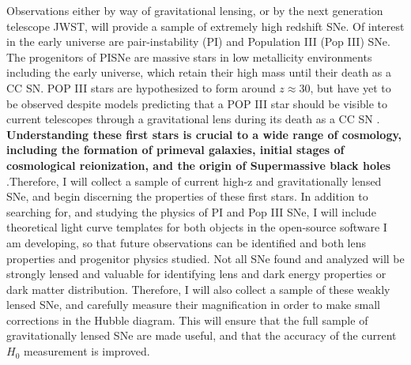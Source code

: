 Observations either  by way of  gravitational lensing, or by  the next
generation telescope  JWST, will  provide a  sample of  extremely high
redshift SNe. Of  interest in the early  universe are pair-instability
(PI) and  Population III (Pop III)  SNe. The progenitors of  PISNe are
massive  stars in  low  metallicity environments  including the  early
universe,  which retain  their high  mass until  their death  as a  CC
SN. POP  III stars are  hypothesized to form around  $z\approx30$, but
have yet to be observed despite  models predicting that a POP III star
should be visible  to current telescopes through  a gravitational lens
during its death as  a CC SN \citep{marri:1998}. \textbf{Understanding
these first stars  is crucial to a wide range  of cosmology, including
the  formation of  primeval galaxies,  initial stages  of cosmological
reionization,    and     the    origin    of     Supermassive    black
holes}  \citep{Whalen:2013}.Therefore,  I  will collect  a  sample  of
current high-z  and gravitationally  lensed SNe, and  begin discerning
the properties of these first stars. In addition to searching for, and
studying the physics of PI and Pop III SNe, I will include theoretical
light curve templates  for both objects in the  open-source software I
am developing, so that future  observations can be identified and both
lens properties and progenitor physics  studied. Not all SNe found and
analyzed will be strongly lensed and valuable for identifying lens and
dark energy properties or dark  matter distribution. Therefore, I will
also  collect a  sample  of  these weakly  lensed  SNe, and  carefully
measure their magnification in order  to make small corrections in the
Hubble   diagram.  This   will  ensure   that  the   full  sample   of
gravitationally lensed SNe  are made useful, and that  the accuracy of
the current $H_0$ measurement is improved.

\

